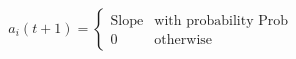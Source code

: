 \begin{equation}
  a_i(t+1)=\left\{
    \begin{array}{ll}
      \mbox{Slope} & \mbox{with probability Prob}\\
      0            & \mbox{otherwise}
    \end{array} \right.
\end{equation}
